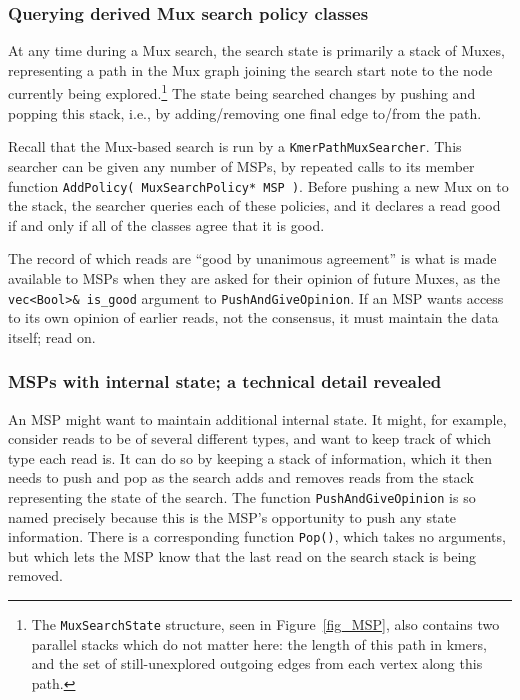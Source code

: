 \documentclass[11pt]{article}
\begin{document}
\subsubsection*{Querying derived Mux search policy classes}

At any time during a Mux search, the search state is primarily a stack
of Muxes, representing a path in the Mux graph joining the search start
note to the node currently being explored.\footnote{The {\tt MuxSearchState}
structure, seen in Figure~\ref{fig_MSP}, also contains two parallel stacks which 
do not matter here: the length of this path in kmers, and the set of still-unexplored 
outgoing edges from each vertex along this path.}
The state being searched changes by pushing and popping this stack,
i.e., by adding/removing one final edge to/from the path.

Recall that the Mux-based search is run by a {\tt KmerPathMuxSearcher}.
This searcher can be given any number of MSPs, by repeated calls to its
member function \verb"AddPolicy( MuxSearchPolicy* MSP )".
Before pushing a new Mux on to the stack, the searcher queries each of
these policies, and it declares a read good if and only if all of the classes
agree that it is good.  

The record of which reads are ``good by unanimous 
agreement'' is what is made available to MSPs when they are asked for their 
opinion of future Muxes, as the \verb"vec<Bool>& is_good" argument to 
{\tt PushAndGiveOpinion}.  If an MSP wants access to its own opinion
of earlier reads, not the consensus, it must maintain the data itself; read on.



\subsubsection*{MSPs with internal state; a technical detail revealed}

An MSP might want to maintain additional internal state.  It might, for example,
consider reads to be of several different types, and want to keep track of which type
each read is.  It can do so by keeping a stack of information, which it then needs
to push and pop as the search adds and removes reads from the stack representing
the state of the search.  The function {\tt PushAndGiveOpinion} is so named precisely
because this is the MSP's opportunity to push any state information.
There is a corresponding function {\tt Pop()}, which takes no arguments, but which
lets the MSP know that the last read on the search stack is being removed.
\end{document}

